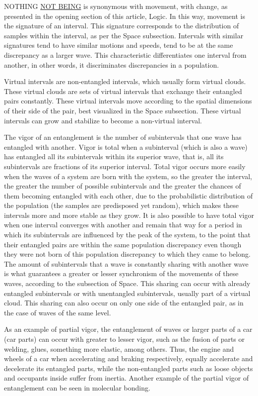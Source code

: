 NOTHING \underline{NOT BEING} is synonymous with movement, with change, as presented in the opening section of this article, Logic. In this way, movement is the signature of an interval. This signature corresponds to the distribution of samples within the interval, as per the Space subsection. Intervals with similar signatures tend to have similar motions and speeds, tend to be at the same discrepancy as a larger wave. This characteristic differentiates one interval from another, in other words, it discriminates discrepancies in a population.

Virtual intervals are non-entangled intervals, which usually form virtual clouds. These virtual clouds are sets of virtual intervals that exchange their entangled pairs constantly. These virtual intervals move according to the spatial dimensions of their side of the pair, best visualized in the Space subsection. These virtual intervals can grow and stabilize to become a non-virtual interval.

The vigor of an entanglement is the number of subintervals that one wave has entangled with another. Vigor is total when a subinterval (which is also a wave) has entangled all its subintervals within its superior wave, that is, all its subintervals are fractions of its superior interval. Total vigor occurs more easily when the waves of a system are born with the system, so the greater the interval, the greater the number of possible subintervals and the greater the chances of them becoming entangled with each other, due to the probabilistic distribution of the population (the samples are predisposed yet random), which makes these intervals more and more stable as they grow. It is also possible to have total vigor when one interval converges with another and remain that way for a period in which its subintervals are influenced by the peak of the system, to the point that their entangled pairs are within the same population discrepancy even though they were not born of this population discrepancy to which they came to belong. The amount of subintervals that a wave is constantly sharing with another wave is what guarantees a greater or lesser synchronism of the movements of these waves, according to the subsection of Space. This sharing can occur with already entangled subintervals or with unentangled subintervals, usually part of a virtual cloud. This sharing can also occur on only one side of the entangled pair, as in the case of waves of the same level.

As an example of partial vigor, the entanglement of waves or larger parts of a car (car parts) can occur with greater to lesser vigor, such as the fusion of parts or welding, glues, something more elastic, among others. Thus, the engine and wheels of a car when accelerating and braking respectively, equally accelerate and decelerate its entangled parts, while the non-entangled parts such as loose objects and occupants inside suffer from inertia. Another example of the partial vigor of entanglement can be seen in molecular bonding.

